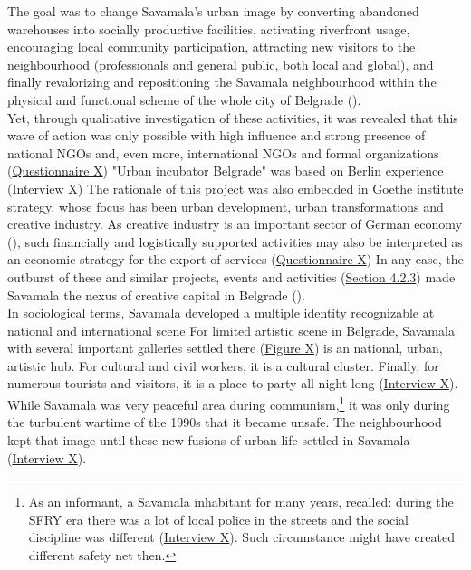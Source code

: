 \documentclass[11pt]{report}
\begin{document}
The goal was to change Savamala's urban image by converting  abandoned warehouses into socially productive facilities, activating riverfront usage, encouraging local community participation, attracting new visitors to the neighbourhood (professionals and general public, both local and global), and finally revalorizing and repositioning the Savamala neighbourhood within the physical and functional scheme of the whole city of Belgrade (\href{Cvetinovic}{\cite{cvetinovic_engine_2013}}).
\\

Yet, through qualitative investigation of these activities, it was revealed that this wave of action was only possible with high influence and strong presence of national NGOs and, even more, international NGOs and formal organizations
(\href{Questionnaire Experts Savamala}{Questionnaire X}) 
"Urban incubator Belgrade" was based on Berlin experience
(\href{InterviewX}{Interview X})
The rationale of this project was also embedded in Goethe institute strategy, whose focus has been urban development, urban transformations and creative industry.
As creative industry is an important sector of German economy 
(\href{Lanz}{\cite{lanz_cities_2012}}),
such financially and logistically supported activities may also be interpreted as an economic strategy for the export of services (\href{Questionnaire Experts Savamala}{Questionnaire X})
In any case, the outburst of these and similar projects, events and activities (\href{Section 4.2.3}{Section 4.2.3}) made Savamala the nexus of creative capital in Belgrade (\href{B92}{\cite{B92 2015}}). %
\\

In sociological terms, Savamala developed a multiple identity recognizable at national and international scene
For limited artistic scene in Belgrade, Savamala with several important galleries settled there (\href{Figure X}{Figure X})
is an national, urban, artistic hub.
For cultural and civil workers, it is a cultural cluster.
Finally, for numerous tourists and visitors, it is a place to party all night long (\href{InterviewX}{Interview X}).
\\

While Savamala was very peaceful area during communism,\footnote{As an informant, a Savamala inhabitant for many years, recalled: during the SFRY era there was a lot of local police in the streets and the social discipline was different
(\href{InterviewX}{Interview X}).
Such circumstance might have created different safety net then.}
it was only during the turbulent wartime of the 1990s that it became unsafe.
The neighbourhood kept that image until these new fusions of urban life settled in Savamala (\href{InterviewX}{Interview X}).
\\
\end{document}
